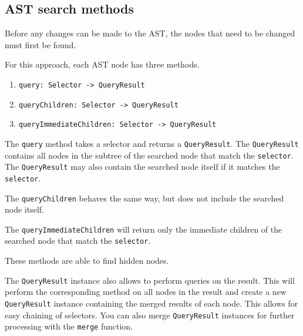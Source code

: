 
\subsection{AST search methods}

Before any changes can be made to the AST, the nodes that need to be changed must first be found.

For this approach, each AST node has three methods.

\begin{enumerate}
\item \verb|query: Selector -> QueryResult|
\item \verb|queryChildren: Selector -> QueryResult|
\item \verb|queryImmediateChildren: Selector -> QueryResult|
\end{enumerate}

The \verb|query| method takes a selector and returns a \verb|QueryResult|.
The \verb|QueryResult| contains all nodes in the subtree of the searched node that match the \verb|selector|. 
The \verb|QueryResult| may also contain the searched node itself if it matches the \verb|selector|.

The \verb|queryChildren| behaves the same way, but does not include the searched node itself.

The \verb|queryImmediateChildren| will return only the immediate children of the searched node that match the \verb|selector|.

These methods are able to find hidden nodes.

The \verb|QueryResult| instance also allows to perform queries on the result. 
This will perform the corresponding method on all nodes in the result and create a new \verb|QueryResult| instance containing the merged results of each node. 
This allows for easy chaining of selectors. 
You can also merge \verb|QueryResult| instances for further processing with the \verb|merge| function.
